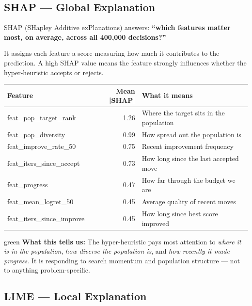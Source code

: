 \documentclass[12pt, a4paper]{article}
\begin{document}
\subsection{SHAP --- Global Explanation}

SHAP (SHapley Additive exPlanations) answers: \textbf{``which features
matter most, on average, across all 400,000 decisions?''}

It assigns each feature a score measuring how much it contributes to the
prediction. A high SHAP value means the feature strongly influences whether
the hyper-heuristic accepts or rejects.

\vspace{0.3cm}
\begin{center}
\begin{tabularx}{\linewidth}{>{\ttfamily}p{4.8cm} r X}
\toprule
\textbf{Feature} & \textbf{Mean |SHAP|} & \textbf{What it means} \\
\midrule
feat\_pop\_target\_rank   & 1.26 & Where the target sits in the population \\
feat\_pop\_diversity      & 0.99 & How spread out the population is \\
feat\_improve\_rate\_50   & 0.75 & Recent improvement frequency \\
feat\_iters\_since\_accept & 0.73 & How long since the last accepted move \\
feat\_progress            & 0.47 & How far through the budget we are \\
feat\_mean\_logret\_50    & 0.45 & Average quality of recent moves \\
feat\_iters\_since\_improve & 0.45 & How long since best score improved \\
\bottomrule
\end{tabularx}
\end{center}

\vspace{0.3cm}
\begin{simplebox}{green}
\textbf{What this tells us:} The hyper-heuristic pays most attention to
\emph{where it is in the population}, \emph{how diverse the population is},
and \emph{how recently it made progress}. It is responding to search momentum
and population structure --- not to anything problem-specific.
\end{simplebox}

\subsection{LIME --- Local Explanation}
\end{document}
